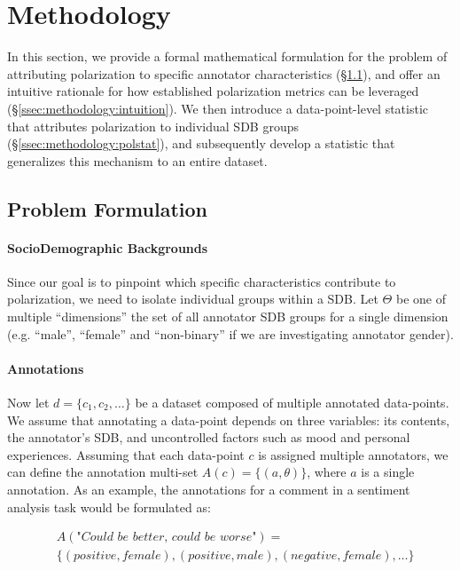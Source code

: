 \documentclass{article}
\begin{document}
\section{Methodology}
\label{sec:methodology}

In this section, we provide a formal mathematical formulation for the problem of attributing polarization to specific annotator characteristics (\S\ref{ssec:methodology:problem}), and offer an intuitive rationale for how established polarization metrics can be leveraged (\S\ref{ssec:methodology:intuition}). We then introduce a data-point-level statistic that attributes polarization to individual \ac{SDB} groups (\S\ref{ssec:methodology:polstat}), and subsequently develop a statistic that generalizes this mechanism to an entire dataset.


\subsection{Problem Formulation}
\label{ssec:methodology:problem}

\paragraph{SocioDemographic Backgrounds }Since our goal is to pinpoint which specific characteristics contribute to polarization, we need to isolate individual groups within a \ac{SDB}. Let $\Theta$ be one of multiple ``dimensions'' the set of all annotator \ac{SDB} groups for a single dimension (e.g. ``male'', ``female'' and ``non-binary'' if we are investigating annotator gender).

\paragraph{Annotations} Now let $d = \{c_1, c_2, \ldots\}$ be a dataset composed of multiple annotated data-points. We assume that annotating a data-point depends on three variables: its contents, the annotator's \ac{SDB}, and uncontrolled factors such as mood and personal experiences. Assuming that each data-point $c$ is assigned multiple annotators, we can define the annotation multi-set $A(c)=  \{(a, \theta) \}$, where $a$ is a single annotation. As an example, the annotations for a comment in a sentiment analysis task would be formulated as:

\begin{equation}
	\begin{split}
		&A(\textit{"Could be better, could be worse"}) = \\ &\{(\textit{positive}, female), (\textit{positive}, male), (\textit{negative}, female), \ldots\}
	\end{split}
\end{equation}
\end{document}
